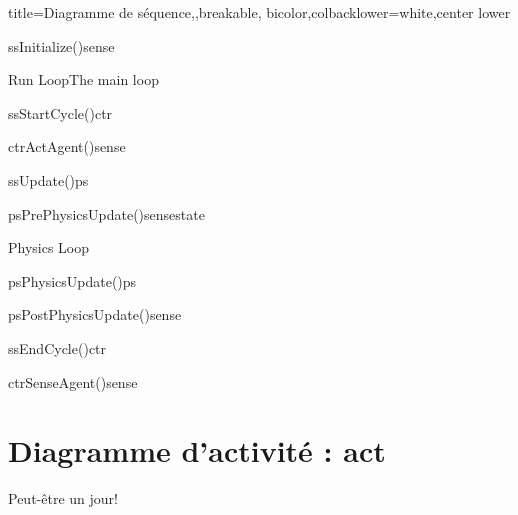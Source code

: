 \documentclass[a4paper,11pt]{article}                      %
\begin{document}
\begin{tcblisting}{title={Diagramme de séquence},,breakable, bicolor,colbacklower=white,center lower}
\begin{sequencediagram}
  
  \begin{call}{ss}{Initialize()}{sense}{}
  \end{call}
  \begin{sdblock}{Run Loop}{The main loop}
    \begin{call}{ss}{StartCycle()}{ctr}{}
      \begin{call}{ctr}{ActAgent()}{sense}{}
      \end{call}
    \end{call}
    \begin{call}{ss}{Update()}{ps}{}
      \begin{messcall}{ps}{PrePhysicsUpdate()}{sense}{state}
      \end{messcall}
      \begin{sdblock}{Physics Loop}{}
        \begin{call}{ps}{PhysicsUpdate()}{ps}{}
        \end{call}
      \end{sdblock}
      \begin{call}{ps}{PostPhysicsUpdate()}{sense}{}
      \end{call}
    \end{call}
    \begin{call}{ss}{EndCycle()}{ctr}{}
      \begin{call}{ctr}{SenseAgent()}{sense}{}
      \end{call}
    \end{call}
  \end{sdblock}
\end{sequencediagram}
\end{tcblisting}


\section{Diagramme d'activité : act}

Peut-être un jour!
\end{document}
